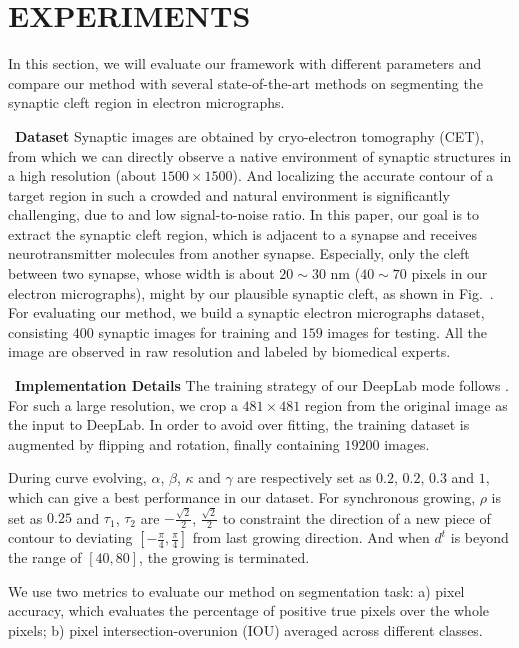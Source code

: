 \section{EXPERIMENTS}
In this section, we will evaluate our framework with different parameters and compare our method with several state-of-the-art methods on segmenting the synaptic cleft region in electron micrographs.

~\noindent\textbf{Dataset}
Synaptic images are obtained by cryo-electron tomography (CET), from which we can directly observe a native environment of synaptic structures in a high resolution (about $1500\times 1500$).
%
And localizing the accurate contour of a target region in such a crowded and natural environment is significantly challenging, due to  and low signal-to-noise ratio.
In this paper, our goal is to extract the synaptic cleft region, which is adjacent to a synapse and receives neurotransmitter molecules from another synapse.
Especially, only the cleft between two synapse, whose width is about $20\sim30$ nm ($40\sim70$ pixels in our electron micrographs), might by our plausible synaptic cleft, as shown in Fig.~.
%
For evaluating our method, we build a synaptic electron micrographs dataset, consisting $400$ synaptic images for training and $159$ images for testing.
All the image are observed in raw resolution and labeled by biomedical experts.

~\noindent\textbf{Implementation Details}
The training strategy of our DeepLab mode follows \cite{Chen2016a}.
For such a large resolution, we crop a $481\times 481$ region \cite{Chen2016} from the original image as the input to DeepLab.
In order to avoid over fitting, the training dataset is augmented by flipping and rotation, finally containing $19200$ images.

During curve evolving, $\alpha$, $\beta$, $\kappa$ and $\gamma$ are respectively set as $0.2$, $0.2$, $0.3$ and $1$, which can give a best performance in our dataset.
For synchronous growing, $\rho$ is set as $0.25$ and $\tau_1$, $\tau_2$ are $-\frac{\sqrt{2}}{2}$, $\frac{\sqrt{2}}{2}$ to constraint the direction of a new piece of contour to deviating $[-\frac{\pi}{4},\frac{\pi}{4}]$ from last growing direction.
And when $d^{t}$ is beyond the range of $[40,80]$, the growing is terminated.

We use two metrics \cite{Cheng2017} to evaluate our method on segmentation task:
a) pixel accuracy, which evaluates the percentage of positive true pixels over the whole pixels;
b) pixel intersection-overunion (IOU) averaged across different classes.

